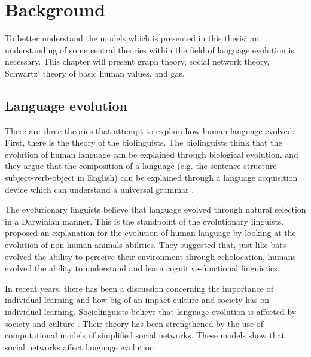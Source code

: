 \acresetall
\chapter{Background}\label{ch:background}
To better understand the models which is presented in this thesis, an understanding of some central theories within the field of language evolution is necessary. This chapter will present graph theory, social network theory, Schwartz' theory of basic human values, and \acp{ga}.

\section{Language evolution}
There are three theories that attempt to explain how human language evolved. First, there is the theory of the biolinguists. The biolinguists think that the evolution of human language can be explained through biological evolution, and they argue that the composition of a language (e.g. the sentence structure subject-verb-object in English) can be explained through a language acquisition device which can understand a universal grammar \citep{chomsky1965some}.

The evolutionary linguists believe that language evolved through natural selection in a Darwinian manner. This is the standpoint of the evolutionary linguists. \citet{pinker1994regular} proposed an explanation for the evolution of human language by looking at the evolution of non-human animals abilities. They suggested that, just like bats evolved the ability to perceive their environment through echolocation, humans evolved the ability to understand and learn cognitive-functional linguistics.

In recent years, there has been a discussion concerning the importance of individual learning and how big of an impact culture and society has on individual learning. Sociolinguists believe that language evolution is affected by society and culture \citep{tomasello2003makes}. Their theory has been strengthened by the use of computational models of simplified social networks. These models show that social networks affect language evolution.

